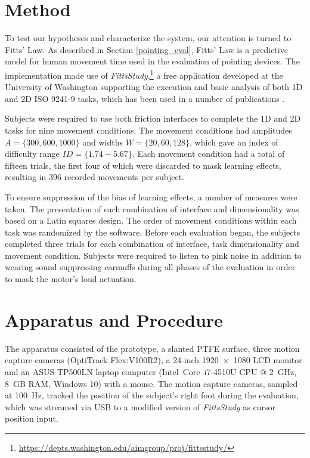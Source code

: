 \documentclass [12pt,letterpaper]{report}
\begin{document}
\section{Method}

To test our hypotheses and characterize the system, our attention is turned to Fitts' Law. As described in Section \ref{pointing_eval}, Fitts' Law is a predictive model for human movement time used in the evaluation of pointing devices. The implementation made use of \textit{FittsStudy},\footnote{\url{https://depts.washington.edu/aimgroup/proj/fittsstudy/}} a free application developed at the University of Washington supporting the execution and basic analysis of both 1D and 2D ISO 9241-9 tasks, which has been used in a number of publications \cite{wobbrock2008error,wobbrock2011modeling,wobbrock2011effects,velloso2015interactions}.

Subjects were required to use both friction interfaces to complete the 1D and 2D tasks for nine movement conditions. The movement conditions had amplitudes $A=\{300,600,1000\}$ and widths $W=\{20,60,128\}$, which gave an index of difficulty range $I\!D=\{1.74-5.67\}$. Each movement condition had a total of fifteen trials, the first four of which were discarded to mask learning effects, resulting in 396 recorded movements per subject.


To ensure suppression of the bias of learning effects, a number of measures were taken. The presentation of each combination of interface and dimensionality was based on a Latin squares design. The order of movement conditions within each task was randomized by the software. Before each evaluation began, the subjects completed three trials for each combination of interface, task dimensionality and movement condition. Subjects were required to listen to pink noise in addition to wearing sound suppressing earmuffs during all phases of the evaluation in order to mask the motor's loud actuation.


\section{Apparatus and Procedure}

The apparatus consisted of the prototype, a slanted PTFE surface, three motion capture cameras (OptiTrack Flex:V100R2), a 24-inch  1920~$\times$~1080 LCD monitor and an ASUS TP500LN laptop computer (Intel\textregistered~Core\texttrademark~i7-4510U CPU $@$ 2~GHz, 8~GB RAM, Windows 10) with a mouse. The motion capture cameras, sampled at 100~Hz, tracked the position of the subject's right foot during the evaluation, which was streamed via USB to a modified version of \textit{FittsStudy} as cursor position input. %
\end{document}
